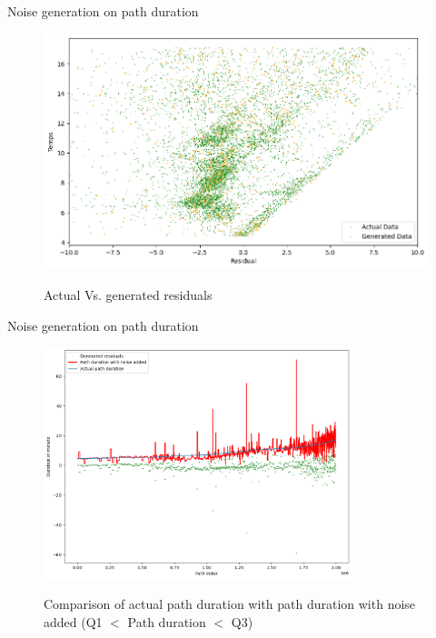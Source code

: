 \documentclass{beamer}
\begin{document}
\begin{frame}{Noise generation on path duration} 

\begin{figure}[ht]
    \includegraphics[width=\linewidth]{Q1_Q3 actual Vs. generated.png}\\
    \caption{Actual Vs. generated residuals}
    \label{fig:Actual Vs. generated residuals (Q1 < time duration < Q3)}
\end{figure}

\end{frame}



\begin{frame}{Noise generation on path duration}

\begin{figure}[h]
    \centering
    \includegraphics[width=0.8\textwidth]{Q1_Q3 path duration noised.png}\\
    \caption{Comparison of actual path duration with path duration with noise added (Q1 $<$ Path duration $<$ Q3)}
    \label{fig:Q1_Q3 path duration noised.png}
\end{figure}
    
\end{frame}
\end{document}
